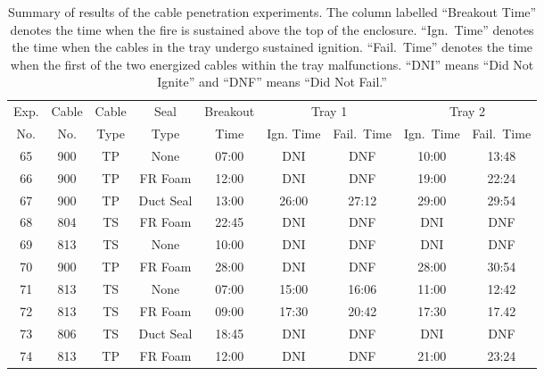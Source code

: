 \begin{table}[ht]
\centering
\caption[Summary of results of penetration experiments]{Summary of results of the cable penetration experiments. The column labelled ``Breakout Time'' denotes the time when the fire is sustained above the top of the enclosure. ``Ign.~Time'' denotes the time when the cables in the tray undergo sustained ignition. ``Fail.~Time'' denotes the time when the first of the two energized cables within the tray malfunctions. ``DNI'' means ``Did Not Ignite'' and ``DNF'' means ``Did Not Fail.'' }
\label{penetration_matrix}
\begin{tabular}{|c|c|c|c|c|c|c|c|c|}
\hline
Exp.   & Cable   & Cable    & Seal             & Breakout  & \multicolumn{2}{|c|}{Tray 1}  & \multicolumn{2}{|c|}{Tray 2}  \\ \cline{6-9}
No.    & No.     & Type     & Type             & Time      & Ign. Time  & Fail.~Time       & Ign.~Time  & Fail.~Time       \\ \hline
65     & 900     & TP       & None             & 07:00     & DNI        & DNF              & 10:00      & 13:48            \\ \hline
66     & 900     & TP       & FR Foam          & 12:00     & DNI        & DNF              & 19:00      & 22:24            \\ \hline
67     & 900     & TP       & Duct Seal        & 13:00     & 26:00      & 27:12            & 29:00      & 29:54            \\ \hline
68     & 804     & TS       & FR Foam          & 22:45     & DNI        & DNF              & DNI        & DNF              \\ \hline
69     & 813     & TS       & None             & 10:00     & DNI        & DNF              & DNI        & DNF              \\ \hline
70     & 900     & TP       & FR Foam          & 28:00     & DNI        & DNF              & 28:00      & 30:54            \\ \hline
71     & 813     & TS       & None             & 07:00     & 15:00      & 16:06            & 11:00      & 12:42            \\ \hline
72     & 813     & TS       & FR Foam          & 09:00     & 17:30      & 20:42            & 17:30      & 17.42            \\ \hline
73     & 806     & TS       & Duct Seal        & 18:45     & DNI        & DNF              & DNI        & DNF              \\ \hline
74     & 813     & TP       & FR Foam          & 12:00     & DNI        & DNF              & 21:00      & 23:24            \\ \hline

\end{tabular}
\end{table}
